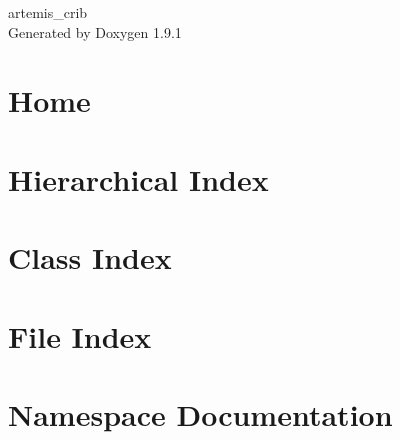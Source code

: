 \let\mypdfximage\pdfximage\def\pdfximage{\immediate\mypdfximage}\documentclass[twoside]{book}
\newcommand{\+}{\discretionary{\mbox{\scriptsize$\hookleftarrow$}}{}{}}
\newcommand{\clearemptydoublepage}{%
  \newpage{\pagestyle{empty}\cleardoublepage}%
}
\begin{document}
\raggedbottom

\hypersetup{pageanchor=false,
             bookmarksnumbered=true,
             pdfencoding=unicode
            }
\begin{titlepage}
\vspace*{7cm}
\begin{center}%
{\Large artemis\+\_\+crib }\\
\vspace*{1cm}
{\large Generated by Doxygen 1.9.1}\\
\end{center}
\end{titlepage}
\clearemptydoublepage
{}
\tableofcontents
\clearemptydoublepage
{}
\hypersetup{pageanchor=true}

\chapter{Home}
\label{index}\hypertarget{index}{}
\chapter{Hierarchical Index}

\chapter{Class Index}

\chapter{File Index}

\chapter{Namespace Documentation}

\end{document}
